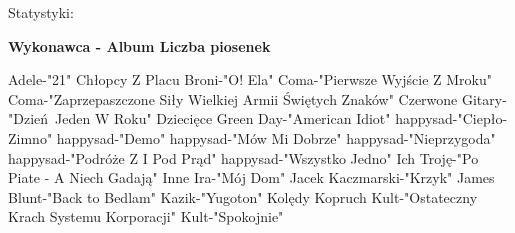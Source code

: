 \documentclass{article}
\begin{document}
 \newpage
 \newpage
 \newpage
 \newpage
 \newpage
 \newpage
 \newpage
 \newpage
 \newpage
 \newpage
Statystyki: \newline
\TabPositions{9cm}
{\footnotesize
\textbf{Wykonawca - Album  \tab Liczba piosenek} 


 Adele-"21"   \newline
 Chłopcy Z Placu Broni-"O! Ela"   \newline
 Coma-"Pierwsze Wyjście Z Mroku"   \newline
 Coma-"Zaprzepaszczone Siły Wielkiej Armii Świętych Znaków"   \newline
 Czerwone Gitary-"Dzień Jeden W Roku"   \newline
 Dziecięce   \newline
 Green Day-"American Idiot"   \newline
 happysad-"Ciepło-Zimno"   \newline
 happysad-"Demo"   \newline
 happysad-"Mów Mi Dobrze"   \newline
 happysad-"Nieprzygoda"   \newline
 happysad-"Podróże Z I Pod Prąd"   \newline
 happysad-"Wszystko Jedno"   \newline
 Ich Troję-"Po Piate - A Niech Gadają"   \newline
 Inne   \newline
 Ira-"Mój Dom"   \newline
 Jacek Kaczmarski-"Krzyk"   \newline
 James Blunt-"Back to Bedlam"   \newline
 Kazik-"Yugoton"   \newline
 Kolędy   \newline
 Kopruch   \newline
 Kult-"Ostateczny Krach Systemu Korporacji"   \newline
 Kult-"Spokojnie"   \newline
}
\end{document}
